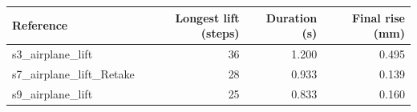 \begin{tabular}{lrrr}
\toprule
Reference & Longest lift (steps) & Duration (s) & Final rise (mm)\\
\midrule
s3\_airplane\_lift & 36 & 1.200 & 0.495\\
s7\_airplane\_lift\_Retake & 28 & 0.933 & 0.139\\
s9\_airplane\_lift & 25 & 0.833 & 0.160\\
\bottomrule
\end{tabular}
